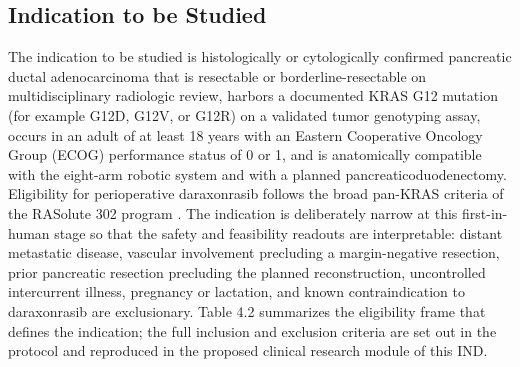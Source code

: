\subsection{Indication to be Studied}

The indication to be studied is histologically or cytologically confirmed pancreatic
ductal adenocarcinoma that is resectable or borderline-resectable on
multidisciplinary radiologic review, harbors a documented KRAS G12 mutation (for
example G12D, G12V, or G12R) on a validated tumor genotyping assay, occurs in an
adult of at least 18 years with an Eastern Cooperative Oncology Group (ECOG)
performance status of 0 or 1, and is anatomically compatible with the eight-arm
robotic system and with a planned pancreaticoduodenectomy. Eligibility for
perioperative daraxonrasib follows the broad pan-KRAS criteria of the RASolute 302
program \cite{daraxwhipple}. The indication is deliberately narrow at this
first-in-human stage so that the safety and feasibility readouts are interpretable:
distant metastatic disease, vascular involvement precluding a margin-negative
resection, prior pancreatic resection precluding the planned reconstruction,
uncontrolled intercurrent illness, pregnancy or lactation, and known
contraindication to daraxonrasib are exclusionary. Table 4.2 summarizes the
eligibility frame that defines the indication; the full inclusion and exclusion
criteria are set out in the protocol and reproduced in the proposed clinical
research module of this IND.

